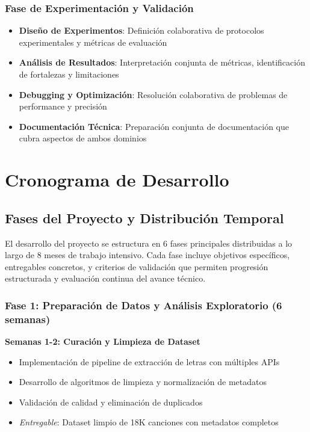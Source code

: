 \documentclass[12pt,a4paper]{article}
\begin{document}
\subsubsection{Fase de Experimentación y Validación}

\begin{itemize}
    \item \textbf{Diseño de Experimentos}: Definición colaborativa de protocolos experimentales y métricas de evaluación
    \item \textbf{Análisis de Resultados}: Interpretación conjunta de métricas, identificación de fortalezas y limitaciones
    \item \textbf{Debugging y Optimización}: Resolución colaborativa de problemas de performance y precisión
    \item \textbf{Documentación Técnica}: Preparación conjunta de documentación que cubra aspectos de ambos dominios
\end{itemize}


\section{Cronograma de Desarrollo}

\subsection{Fases del Proyecto y Distribución Temporal}

El desarrollo del proyecto se estructura en 6 fases principales distribuidas a lo largo de 8 meses de trabajo intensivo. Cada fase incluye objetivos específicos, entregables concretos, y criterios de validación que permiten progresión estructurada y evaluación continua del avance técnico.

\subsubsection{Fase 1: Preparación de Datos y Análisis Exploratorio (6 semanas)}

\textbf{Semanas 1-2: Curación y Limpieza de Dataset}
\begin{itemize}
    \item Implementación de pipeline de extracción de letras con múltiples APIs
    \item Desarrollo de algoritmos de limpieza y normalización de metadatos
    \item Validación de calidad y eliminación de duplicados
    \item \textit{Entregable}: Dataset limpio de 18K canciones con metadatos completos
\end{itemize}
\end{document}

